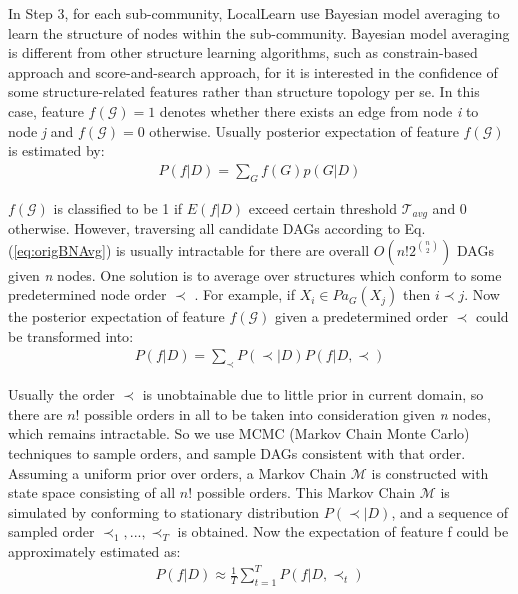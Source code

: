 
In Step 3, for each sub-community, LocalLearn use Bayesian model averaging to learn the structure of nodes within the sub-community. Bayesian model averaging is different from other structure learning algorithms, such as constrain-based approach and score-and-search approach, for it is interested in the confidence of some structure-related features rather than structure topology per se. In this case, feature $f(\mathcal{G})=1$ denotes whether there exists an edge from node \emph{i} to node \emph{j} and $f(\mathcal{G})=0$ otherwise. Usually posterior expectation of feature $f(\mathcal{G})$ is estimated by:\\
\begin{equation}
\begin{aligned}
P(f|D)=\sum_{G}f(G)p(G|D)
\end{aligned}
\label{eq:origBNAvg}
\end{equation}

$f(\mathcal{G})$ is classified to be 1 if $E(f|D)$ exceed certain threshold $\mathcal {T}_{avg}$ and 0 otherwise. However, traversing all candidate DAGs according to Eq.(\ref{eq:origBNAvg}) is usually intractable for there are overall $O(n!2^{\binom{n}{2}})$ DAGs given \emph{n} nodes. One solution is to average over structures which conform to some predetermined node order $\prec$ \cite{DBLP:journals/ml/CooperH92}. For example, if $X_{i} \in Pa_{G}(X_{j})$ then $i \prec j$. Now the posterior expectation of feature $f(\mathcal{G})$ given a predetermined order $\prec$ could be transformed into\cite{Friedman03}: \\
 \begin{equation}
\begin{aligned}
P(f|D)=\sum_{\prec }P(\prec|D)P(f|D, \prec)
\end{aligned}
\label{eq:orderBNAvg}
\end{equation}

Usually the order $\prec$ is unobtainable due to little prior in current domain, so there are $n!$ possible orders in all to be taken into consideration given \emph{n} nodes, which remains intractable. So we use MCMC (Markov Chain Monte Carlo) techniques to sample orders, and sample DAGs consistent with that order\cite{Friedman03}\cite{Eaton07_uai}. Assuming a uniform prior over orders, a Markov Chain $\mathcal {M}$ is constructed with state space consisting of all $n!$ possible orders. This Markov Chain $\mathcal {M}$ is simulated by conforming to stationary distribution $P(\prec|D)$, and a sequence of sampled order $\prec_{1},...,\prec_{T}$ is obtained. Now the expectation of feature f could be approximately estimated as\cite{Friedman03}: \\
 \begin{equation}
\begin{aligned}
P(f|D)\approx \frac{1}{T}\sum_{t=1}^{T}P(f|D, \prec_{t})
\end{aligned}
\label{eq:orderMCMCBNAvg}
\end{equation}

